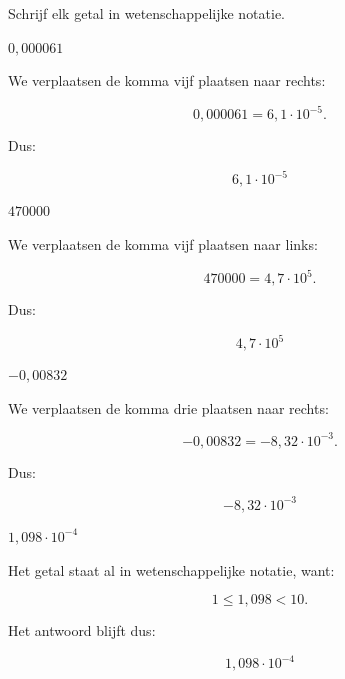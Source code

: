 \documentclass{ximera}
\begin{document}
\begin{oefening}{\oefB\ESS}

Schrijf elk getal in wetenschappelijke notatie.

\begin{question}
\(
0{,}000061
\)

\begin{oplossing}
We verplaatsen de komma vijf plaatsen naar rechts:

\[
0{,}000061
=
6{,}1\cdot10^{-5}.
\]

Dus:

\[
\boxed{6{,}1\cdot10^{-5}}
\]
\end{oplossing}
\end{question}


\begin{question}
\(
470000
\)

\begin{oplossing}
We verplaatsen de komma vijf plaatsen naar links:

\[
470000
=
4{,}7\cdot10^5.
\]

Dus:

\[
\boxed{4{,}7\cdot10^5}
\]
\end{oplossing}
\end{question}


\begin{question}
\(
-0{,}00832
\)

\begin{oplossing}
We verplaatsen de komma drie plaatsen naar rechts:

\[
-0{,}00832
=
-8{,}32\cdot10^{-3}.
\]

Dus:

\[
\boxed{-8{,}32\cdot10^{-3}}
\]
\end{oplossing}
\end{question}


\begin{question}
\(
1{,}098\cdot10^{-4}
\)

\begin{oplossing}
Het getal staat al in wetenschappelijke notatie, want:

\[
1 \leq 1{,}098 < 10.
\]

Het antwoord blijft dus:

\[
\boxed{1{,}098\cdot10^{-4}}
\]
\end{oplossing}
\end{question}

\end{oefening}
\end{document}

